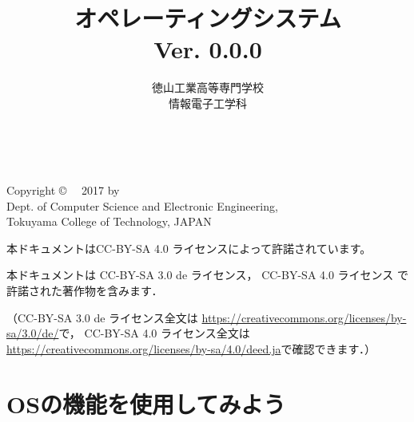 \documentclass[a4paper,11pt,twocolumn,nomag]{ltjsbook}      %
\begin{document}
\frontmatter
\title{オペレーティングシステム\\Ver. 0.0.0}
\author{徳山工業高等専門学校\\情報電子工学科}
\date{}
\maketitle

\thispagestyle{empty}
\onecolumn
~
\vfill
\begin{flushleft}
Copyright \copyright ~~ 2017 by \\
Dept. of Computer Science and Electronic Engineering, \\
Tokuyama College of Technology, JAPAN
\end{flushleft}

\vspace{0.8cm}
本ドキュメントはCC-BY-SA 4.0 ライセンスによって許諾されています。

本ドキュメントは
CC-BY-SA 3.0 de ライセンス，
CC-BY-SA 4.0 ライセンス
で許諾された著作物を含みます．

（CC-BY-SA 3.0 de ライセンス全文は
\url{https://creativecommons.org/licenses/by-sa/3.0/de/}で，
CC-BY-SA 4.0 ライセンス全文は
\url{https://creativecommons.org/licenses/by-sa/4.0/deed.ja}で確認できます．）

\setcounter{tocdepth}{2}
\tableofcontents

\mainmatter

\part{OSの機能を使用してみよう}
\setcounter{page}{23}               %
\end{document}
